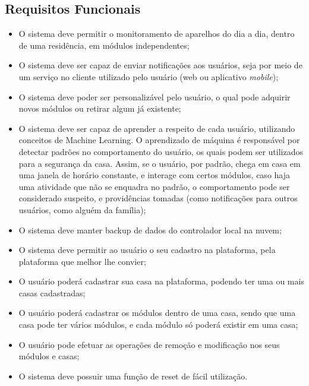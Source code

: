 \subsection{Requisitos Funcionais}
\begin{itemize}
\item O sistema deve permitir o monitoramento de aparelhos do dia a dia, dentro de uma residência, em módulos independentes;
\item O sistema deve ser capaz de enviar notificações aos usuários, seja por meio de um serviço no cliente utilizado pelo usuário (web ou aplicativo \textit{mobile});
\item O sistema deve poder ser personalizável pelo usuário, o qual pode adquirir novos módulos ou retirar algum já existente;
\item O sistema deve ser capaz de aprender a respeito de cada usuário, utilizando conceitos de Machine Learning. O aprendizado de máquina é responsável por detectar padrões no comportamento do usuário, os quais podem ser utilizados para a segurança da casa. Assim, se o usuário, por padrão, chega em casa em uma janela de horário constante, e interage com certos módulos, caso haja uma atividade que não se enquadra no padrão, o comportamento pode ser considerado suspeito, e providências tomadas (como notificações para outros usuários, como alguém da família);
\item O sistema deve manter backup de dados do controlador local na nuvem;
\item O sistema deve permitir ao usuário o seu cadastro na plataforma, pela plataforma que melhor lhe convier;
\item O usuário poderá cadastrar sua casa na plataforma, podendo ter uma ou mais casas cadastradas;
\item O usuário poderá cadastrar os módulos dentro de uma casa, sendo que uma casa pode ter vários módulos, e cada módulo só poderá existir em uma casa;
\item O usuário pode efetuar as operações de remoção e modificação nos seus módulos e casas;
\item O sistema deve possuir uma função de reset de fácil utilização.
\end{itemize}

